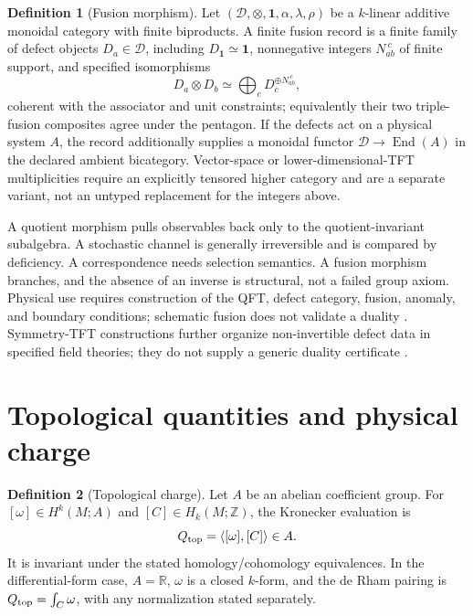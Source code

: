 \documentclass[11pt,a4paper]{article}
\theoremstyle{definition}
\newtheorem{definition}{Definition}[section]
\theoremstyle{plain}
\theoremstyle{remark}
\begin{document}
\begin{definition}[Fusion morphism]\label{def:fusion}
Let \((\mathscr D,\otimes,\mathbf1,\alpha,\lambda,\rho)\) be a
\(k\)-linear additive monoidal category with finite biproducts.  A finite
fusion record is a finite family of defect objects \(D_a\in\mathscr D\),
including \(D_{\mathbf1}\simeq\mathbf1\), nonnegative integers
\(N_{ab}^{\ c}\) of finite support, and specified isomorphisms
\[
D_a\otimes D_b\simeq
\bigoplus_c D_c^{\oplus N_{ab}^{\ c}},
\]
coherent with the associator and unit constraints; equivalently their two
triple-fusion composites agree under the pentagon.  If the defects act on a
physical system \(A\), the record additionally supplies a monoidal functor
\(\mathscr D\to\operatorname{End}(A)\) in the declared ambient bicategory.
Vector-space or lower-dimensional-TFT multiplicities require an explicitly
tensored higher category and are a separate variant, not an untyped
replacement for the integers above.
\end{definition}

A quotient morphism pulls observables back only to the quotient-invariant
subalgebra.  A stochastic channel is generally irreversible and is compared by
deficiency.  A correspondence needs selection semantics.  A fusion morphism
branches, and the absence of an inverse is structural, not a failed group
axiom.  Physical use requires construction of the QFT, defect category,
fusion, anomaly, and boundary conditions; schematic fusion does not validate a
duality \citep{gaiotto2015,choi2022,apruzzi2023}.
Symmetry-TFT constructions further organize non-invertible defect data in
specified field theories; they do not supply a generic duality certificate
\citep{kaidiohmorizheng2022}.

\section{Topological quantities and physical charge}\label{sec:topcharge}

\begin{definition}[Topological charge]\label{def:topcharge}
Let \(A\) be an abelian coefficient group.  For
\([\omega]\in H^k(M;A)\) and \([C]\in H_k(M;\mathbb Z)\), the Kronecker
evaluation is
\[
Q_{\rm top}=\langle[\omega],[C]\rangle\in A .
\]
It is invariant under the stated homology/cohomology equivalences.  In the
differential-form case, \(A=\mathbb R\), \(\omega\) is a closed \(k\)-form,
and the de Rham pairing is \(Q_{\rm top}=\int_C\omega\), with any
normalization stated separately.
\end{definition}
\end{document}
